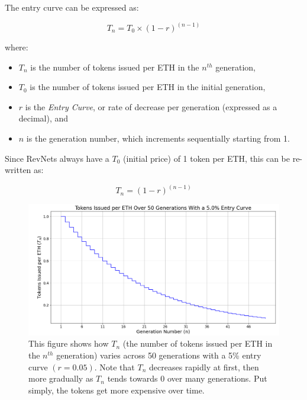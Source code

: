 \documentclass{article}
\begin{document}
The entry curve can be expressed as:

\begin{equation}
  T_n = T_0 \times (1 - r)^{(n - 1)}
\end{equation}

where:
\begin{itemize}
  \item $T_n$ is the number of tokens issued per ETH in the $n^{th}$ generation,
  \item $T_0$ is the number of tokens issued per ETH in the initial generation,
  \item $r$ is the \textit{Entry Curve}, or rate of decrease per generation (expressed as a decimal), and
  \item $n$ is the generation number, which increments sequentially starting from 1.
\end{itemize}

Since RevNets always have a $T_0$ (initial price) of 1 token per ETH, this can be re-written as:

\begin{equation}
  T_n = (1 - r)^{(n - 1)}
\end{equation}

\begin{figure}[h]
  \centering
  \includegraphics[width=\textwidth]{figures/single-entry-curve.png}
   \caption{This figure shows how $T_n$ (the number of tokens issued per ETH in the $n^{th}$ generation) varies across 50 generations with a 5\% entry curve $(r = 0.05)$. Note that $T_n$ decreases rapidly at first, then more gradually as $T_n$ tends towards 0 over many generations. Put simply, the tokens get more expensive over time.}
\end{figure}
\end{document}
